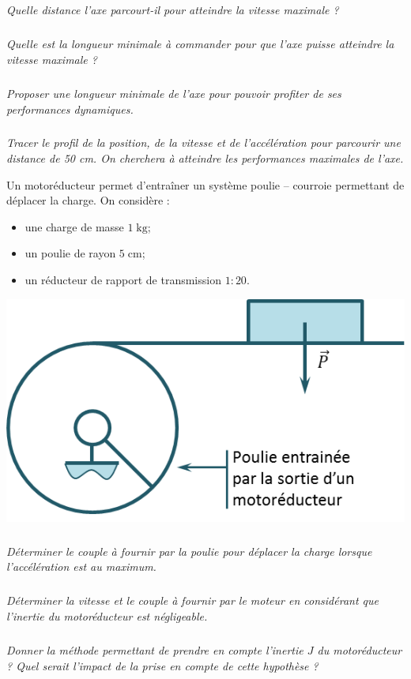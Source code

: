 \documentclass[10pt,fleqn]{book} %
\begin{document}
\begin{multicols}{2}
\subparagraph{}
\textit{Quelle distance l'axe parcourt-il pour atteindre la vitesse maximale ?}


\subparagraph{}
\textit{Quelle est la longueur minimale à commander pour que l'axe puisse atteindre la vitesse maximale ?}

\subparagraph{}
\textit{Proposer une longueur minimale de l'axe pour pouvoir profiter de ses performances dynamiques.}

\subparagraph{}
\textit{Tracer le profil de la position, de la vitesse et de l'accélération pour parcourir une distance de 50 cm. On cherchera à atteindre les performances maximales de l'axe. }

Un motoréducteur permet d'entraîner un système poulie -- courroie permettant de déplacer la charge. On considère :
\begin{itemize}
\item une charge de masse $1\; \text{kg}$;
\item un poulie de rayon $5\; \text{cm}$;
\item un réducteur de rapport de transmission $1:20$.
\end{itemize}

\begin{center}
\includegraphics[width=.9\linewidth]{images/fig_02}
\end{center}

\subparagraph{}
\textit{Déterminer le couple à fournir par la poulie pour déplacer la charge lorsque l'accélération est au maximum. }


\subparagraph{}
\textit{Déterminer la vitesse et le couple à fournir par le moteur en considérant que l'inertie du motoréducteur est négligeable. }


\subparagraph{}
\textit{Donner la méthode permettant de prendre en compte l'inertie $J$ du motoréducteur ? Quel serait l'impact de la prise en compte de cette hypothèse ? }


\end{multicols}
\end{document}
